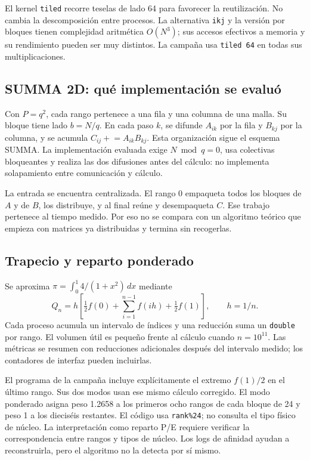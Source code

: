 El kernel \texttt{tiled} recorre teselas de lado 64 para favorecer la reutilización. No cambia la descomposición entre procesos. La alternativa \texttt{ikj} y la versión por bloques tienen complejidad aritmética $O(N^3)$; sus accesos efectivos a memoria y su rendimiento pueden ser muy distintos. La campaña usa \texttt{tiled 64} en todas sus multiplicaciones.

\subsection{SUMMA 2D: qué implementación se evaluó}

Con $P=q^2$, cada rango pertenece a una fila y una columna de una malla. Su bloque tiene lado $b=N/q$. En cada paso $k$, se difunde $A_{ik}$ por la fila y $B_{kj}$ por la columna, y se acumula $C_{ij}\mathrel{+}=A_{ik}B_{kj}$. Esta organización sigue el esquema SUMMA\cite{summa}. La implementación evaluada exige $N\bmod q=0$, usa colectivas bloqueantes y realiza las dos difusiones antes del cálculo: no implementa solapamiento entre comunicación y cálculo.

La entrada se encuentra centralizada. El rango 0 empaqueta todos los bloques de $A$ y de $B$, los distribuye, y al final reúne y desempaqueta $C$. Ese trabajo pertenece al tiempo medido. Por eso no se compara con un algoritmo teórico que empieza con matrices ya distribuidas y termina sin recogerlas.

\subsection{Trapecio y reparto ponderado}

Se aproxima $\pi=\int_0^1 4/(1+x^2)\,dx$ mediante
\[
 Q_n=h\left[\tfrac12 f(0)+\sum_{i=1}^{n-1}f(ih)+\tfrac12 f(1)\right],\qquad h=1/n.
\]
Cada proceso acumula un intervalo de índices y una reducción suma un \texttt{double} por rango. El volumen útil es pequeño frente al cálculo cuando $n=10^{11}$. Las métricas se resumen con reducciones adicionales después del intervalo medido; los contadores de interfaz pueden incluirlas.

El programa de la campaña incluye explícitamente el extremo $f(1)/2$ en el último rango. Sus dos modos usan ese mismo cálculo corregido. El modo ponderado asigna peso 1.2658 a los primeros ocho rangos de cada bloque de 24 y peso 1 a los dieciséis restantes. El código usa \texttt{rank\%24}; no consulta el tipo físico de núcleo. La interpretación como reparto P/E requiere verificar la correspondencia entre rangos y tipos de núcleo. Los logs de afinidad ayudan a reconstruirla, pero el algoritmo no la detecta por sí mismo.

